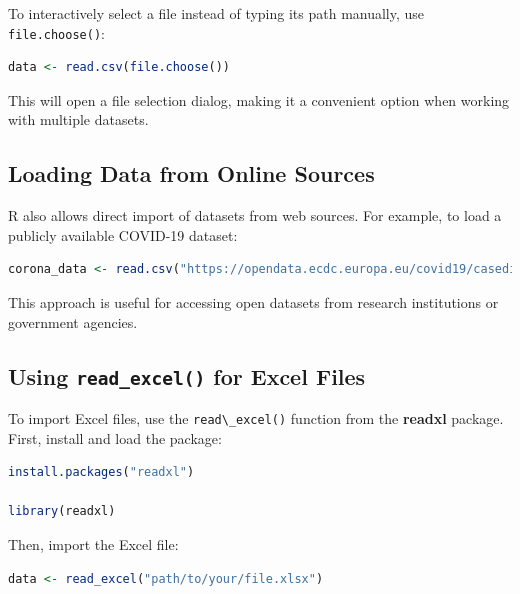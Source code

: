 \documentclass[
]{book}
\newcommand{\passthrough}[1]{#1}
\theoremstyle{definition}
\theoremstyle{definition}
\theoremstyle{definition}
\theoremstyle{definition}
\theoremstyle{remark}
\begin{document}
To interactively select a file instead of typing its path manually, use \passthrough{\lstinline!file.choose()!}:

\begin{lstlisting}[language=R]
data <- read.csv(file.choose())
\end{lstlisting}

This will open a file selection dialog, making it a convenient option when working with multiple datasets.

\subsection*{Loading Data from Online Sources}\label{loading-data-from-online-sources}

R also allows direct import of datasets from web sources. For example, to load a publicly available COVID-19 dataset:

\begin{lstlisting}[language=R]
corona_data <- read.csv("https://opendata.ecdc.europa.eu/covid19/casedistribution/csv", na.strings = "", fileEncoding = "UTF-8-BOM")
\end{lstlisting}

This approach is useful for accessing open datasets from research institutions or government agencies.

\subsection*{\texorpdfstring{Using \texttt{read\_excel()} for Excel Files}{Using read\_excel() for Excel Files}}\label{using-read_excel-for-excel-files}

To import Excel files, use the \passthrough{\lstinline!read\_excel()!} function from the \textbf{readxl} package. First, install and load the package:

\begin{lstlisting}[language=R]
install.packages("readxl")

library(readxl)
\end{lstlisting}

Then, import the Excel file:

\begin{lstlisting}[language=R]
data <- read_excel("path/to/your/file.xlsx")
\end{lstlisting}
\end{document}
